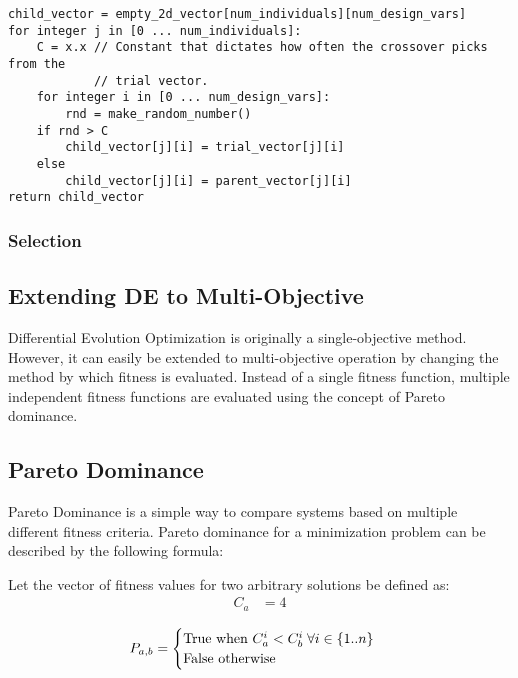 \begin{lstlisting}[caption=Pseudocode for the Crossover Operator \cite{diff-evol},captionpos=b]
child_vector = empty_2d_vector[num_individuals][num_design_vars]
for integer j in [0 ... num_individuals]:
    C = x.x // Constant that dictates how often the crossover picks from the
            // trial vector. 
    for integer i in [0 ... num_design_vars]:
        rnd = make_random_number()
	if rnd > C
	    child_vector[j][i] = trial_vector[j][i]
	else
	    child_vector[j][i] = parent_vector[j][i]
return child_vector
\end{lstlisting}

\subsubsection{Selection}


\subsection{Extending DE to Multi-Objective}
Differential Evolution Optimization is originally a single-objective method. However, it can easily be extended to multi-objective operation by changing the method by which fitness is evaluated. Instead of a single fitness function, multiple independent fitness functions are evaluated using the concept of Pareto dominance. 


\subsection{Pareto Dominance}
Pareto Dominance is a simple way to compare systems based on multiple different fitness criteria. Pareto dominance for a minimization problem can be described by the following formula: 

Let the vector of fitness values for two arbitrary solutions be defined as:
\begin{align*}
C_a &= 4
\end{align*}

$$
P_{a,b} = \begin{cases}
          \hbox{True  when  } C_{a}^i < C_{b}^i \; \forall i \in \{1..n\}\\ 
          \hbox{False otherwise}
          \end{cases}
$$

